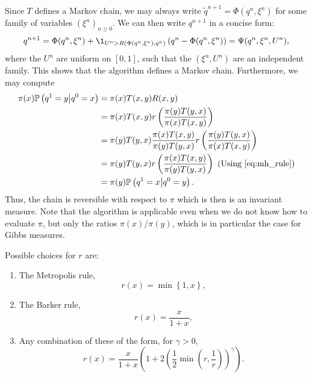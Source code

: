     Since $T$ defines a Markov chain, we may always write $\tilde q^{n+1}=\Phi(q^n,\xi^n)$ for some family of \iid variables $(\xi^n)_{n\geq 0}$. We can then write $q^{n+1}$ in a concise form:
    \begin{equation}
        \label{eq:metropolis_hastings_algorithm}
        q^{n+1}=\Phi(q^n,\xi^n)+\1_{U^n>R\left(\Phi(q^n,\xi^n),q^n\right)}\left(q^n-\Phi(q^n,\xi^n)\right)=\Psi(q^n,\xi^n,U^n),
    \end{equation}
    where the $U^n$ are \iid uniform on $[0,1]$, such that the $(\xi^n,U^n)$ are an independent family. This shows that the algorithm defines a Markov chain. Furthermore, we may compute
    \begin{equation}
        \begin{aligned}
            \pi(x)\mathbb P\left(q^1=y \middle| q^0=x\right)&=\pi(x)T(x,y)R(x,y)\\
            &=\pi(x)T(x,y)r\left(\frac{\pi(y)T(y,x)}{\pi(x)T(x,y)}\right)\\
            &=\pi(y)T(y,x)\frac{\pi(x)T(x,y)}{\pi(y)T(y,x)}r\left(\frac{\pi(y)T(y,x)}{\pi(x)T(x,y)}\right)\\
            &=\pi(y)T(y,x)r\left(\frac{\pi(x)T(x,y)}{\pi(y)T(y,x)}\right)\ \text{(Using \eqref{eq:mh_rule})}\\
            &=\pi(y)\mathbb P\left(q^1=x\middle|q^0=y\right).
        \end{aligned}
    \end{equation}
    Thus, the chain is reversible with respect to $\pi$ which is then is an invariant measure.
    Note that the algorithm is applicable even when we do not know how to evaluate $\pi$, but only the ratios $\pi(x)/\pi(y)$, which is in particular the case for Gibbs measures.

    \begin{remark}
        Possible choices for $r$ are:
        \begin{enumerate}
            \item The Metropolis rule, \[r(x)=\min\left\{1,x\right\},\]
            \item The Barker rule, \[r(x)=\frac{x}{1+x},\]
            \item Any combination of these of the form, for $\gamma>0$, \[r(x)=\frac{x}{1+x}\left(1+2\left(\frac12\min\left(r,\frac 1r\right)\right)^\gamma\right).\]
        \end{enumerate}
    \end{remark}

